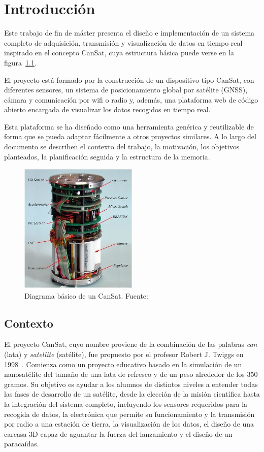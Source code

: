 \chapter{Introducción}

\label{cap:introduccion}
Este trabajo de fin de máster presenta el diseño e implementación de un sistema completo de adquisición, transmisión y visualización de datos en tiempo real inspirado en el concepto CanSat, cuya estructura básica puede verse en la figura~\ref{fig:cansat}.

El proyecto está formado por la construcción de un dispositivo tipo CanSat, con diferentes sensores, un sistema de posicionamiento global por satélite (GNSS), cámara y comunicación por wifi o radio y,
además, una plataforma web de código abierto encargada de visualizar los datos recogidos en tiempo real.

Esta plataforma se ha diseñado como una herramienta genérica y reutilizable de forma que se pueda adaptar fácilmente a otros proyectos similares.
A lo largo del documento se describen el contexto del trabajo, la motivación, los objetivos planteados, la planificación seguida y la estructura de la memoria.

\begin{figure}
    \centering
    \includegraphics[width=0.5\textwidth]{Imagenes/Bitmap/cansat}
    \caption{Diagrama básico de un CanSat. Fuente: \cite{researchgate_cansat2018}}
    \label{fig:cansat}
\end{figure}


\section{Contexto}
El proyecto CanSat, cuyo nombre proviene de la combinación de las palabras \emph{can} (lata) y \emph{satellite} (satélite), fue propuesto por el profesor Robert J. Twiggs en 1998~\cite{jaxa_cansat}. Comienza como un proyecto educativo basado en la simulación de un nanosatélite del tamaño de una lata de refresco y de un peso alrededor de los 350 gramos.
Su objetivo es ayudar a los alumnos de distintos niveles a entender todas las fases de desarrollo de un satélite, desde la elección de la misión científica hasta la integración del sistema completo, incluyendo los sensores requeridos para la recogida de datos, la electrónica que permite su funcionamiento y la transmisión por radio a una estación de tierra,
la visualización de los datos, el diseño de una carcasa 3D capaz de aguantar la fuerza del lanzamiento y el diseño de un paracaídas.

